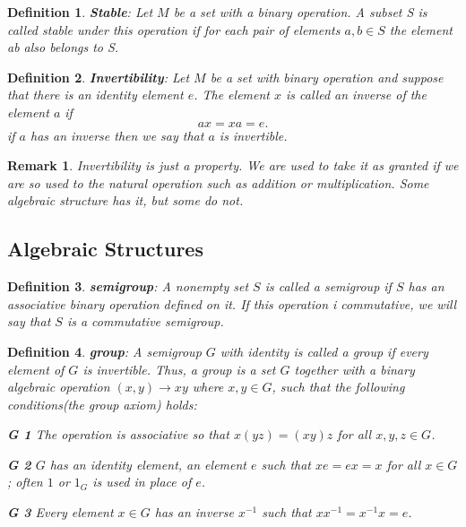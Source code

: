 \documentclass[a4paper]{article}
\newtheorem{definition}{Definition}[section]
\newtheorem{remark}{Remark}[section]
\begin{document}
	\begin{definition}
		\textbf{Stable}: Let $M$ be a set with a binary operation. A subset S
		is called stable under this operation if for each pair of elements
		$a,b \in S$ the element ab also belongs to S.\cite{dixon2011algebra}
	\end{definition}

	\begin{definition}
		\textbf{Invertibility}: Let $M$ be a set with binary operation and
		suppose that there is an identity element $e$. The element $x$ is
		called an inverse of the element $a$ if 
		\begin{displaymath}
			ax = xa = e.
		\end{displaymath}
		if $a$ has an inverse then we say that $a$ is invertible.\cite{dixon2011algebra}
	\end{definition}

	\begin{remark}
		Invertibility is just a property. We are used to take it as granted if we
		are so used to the natural operation such as addition or
		multiplication. Some algebraic structure has it, but some do not.
	\end{remark}

	\subsection{Algebraic Structures}

	\begin{definition}
		\textbf{semigroup}: A nonempty set $S$ is called a semigroup if $S$
		has an associative binary operation defined on it. If this operation i
		commutative, we will say that $S$ is a commutative semigroup.\cite{dixon2011algebra}
	\end{definition}

	\begin{definition}
		\textbf{group}: A semigroup $G$ with identity is called a group if
		every element of $G$ is invertible. Thus, a group is a set $G$
		together with a binary algebraic operation $(x,y) \rightarrow xy$
		where $x,y \in G$, such that the following conditions(the group axiom)
		holds:\cite{dixon2011algebra}
		\begin{compactitem}
		\item \textbf{G 1} The operation is associative so that $x(yz) =
			(xy)z$ for all $x,y,z \in G$.
		\item \textbf{G 2} $G$ has an identity element, an element $e$ such
			that $xe = ex = x$ for all $x \in G$; often $1$ or $1_G$ is used in
			place of $e$.
		\item \textbf{G 3} Every element $x \in G$ has an inverse $x^{-1}$
			such that $xx^{-1} = x^{-1}x = e$.
		\end{compactitem}
	\end{definition}
\end{document}
